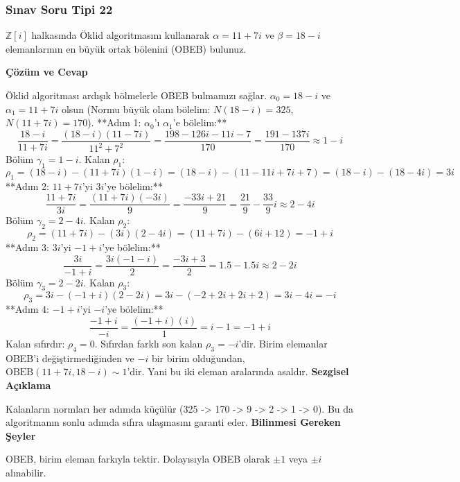 \documentclass[11pt, a4paper]{article}
\newenvironment{cozum}{
    \vspace{0.5cm}
    \noindent\textcolor{green!60!black}{\faCheckCircle\enspace \textbf{\Large Çözüm ve Cevap}}\par\vspace{0.2cm}
}{}
\newenvironment{sezgisel}{
    \vspace{0.5cm}
    \noindent\textcolor{orange!80!black}{\faLightbulb\enspace \textbf{\Large Sezgisel Açıklama}}\par\vspace{0.2cm}
    \itshape
}{}
\newenvironment{bilgi}{
    \vspace{0.5cm}
    \noindent\textcolor{red!70!black}{\faExclamationTriangle\enspace \textbf{\Large Bilinmesi Gereken Şeyler}}\par\vspace{0.2cm}
}{}
\begin{document}
\subsubsection{Sınav Soru Tipi 22}
\begin{sinavbox}
$\mathbb{Z}[i]$ halkasında Öklid algoritmasını kullanarak $\alpha = 11+7i$ ve $\beta = 18-i$ elemanlarının en büyük ortak bölenini (OBEB) bulunuz.
\end{sinavbox}
\begin{cozum}
Öklid algoritması ardışık bölmelerle OBEB bulmamızı sağlar. $\alpha_0 = 18-i$ ve $\alpha_1 = 11+7i$ olsun (Normu büyük olanı bölelim: $N(18-i) = 325$, $N(11+7i) = 170$).
**Adım 1: $\alpha_0$'ı $\alpha_1$'e bölelim:**
\[ \frac{18-i}{11+7i} = \frac{(18-i)(11-7i)}{11^2+7^2} = \frac{198 - 126i - 11i - 7}{170} = \frac{191-137i}{170} \approx 1 - i \]
Bölüm $\gamma_1 = 1-i$. Kalan $\rho_1$:
\[ \rho_1 = (18-i) - (11+7i)(1-i) = (18-i) - (11 - 11i + 7i + 7) = (18-i) - (18-4i) = 3i \]
**Adım 2: $11+7i$'yi $3i$'ye bölelim:**
\[ \frac{11+7i}{3i} = \frac{(11+7i)(-3i)}{9} = \frac{-33i + 21}{9} = \frac{21}{9} - \frac{33}{9}i \approx 2 - 4i \]
Bölüm $\gamma_2 = 2-4i$. Kalan $\rho_2$:
\[ \rho_2 = (11+7i) - (3i)(2-4i) = (11+7i) - (6i + 12) = -1 + i \]
**Adım 3: $3i$'yi $-1+i$'ye bölelim:**
\[ \frac{3i}{-1+i} = \frac{3i(-1-i)}{2} = \frac{-3i + 3}{2} = 1.5 - 1.5i \approx 2 - 2i \]
Bölüm $\gamma_3 = 2-2i$. Kalan $\rho_3$:
\[ \rho_3 = 3i - (-1+i)(2-2i) = 3i - (-2 + 2i + 2i + 2) = 3i - 4i = -i \]
**Adım 4: $-1+i$'yi $-i$'ye bölelim:**
\[ \frac{-1+i}{-i} = \frac{(-1+i)(i)}{1} = i - 1 = -1+i \]
Kalan sıfırdır: $\rho_4 = 0$.
Sıfırdan farklı son kalan $\rho_3 = -i$'dir. Birim elemanlar OBEB'i değiştirmediğinden ve $-i$ bir birim olduğundan, $\text{OBEB}(11+7i, 18-i) \sim 1$'dir. Yani bu iki eleman aralarında asaldır.
\end{cozum}
\begin{sezgisel}
Kalanların normları her adımda küçülür (325 -> 170 -> 9 -> 2 -> 1 -> 0). Bu da algoritmanın sonlu adımda sıfıra ulaşmasını garanti eder.
\end{sezgisel}
\begin{bilgi}
OBEB, birim eleman farkıyla tektir. Dolayısıyla OBEB olarak $\pm 1$ veya $\pm i$ alınabilir.
\end{bilgi}

\newpage
\end{document}
